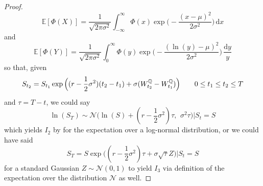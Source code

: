 \documentclass[12pt]{article}
\theoremstyle{definition}
\theoremstyle{remark}
\begin{document}
\begin{proof}
	$$
	\mathbb{E}[\Phi(X)] = \frac{1}{\sqrt{2\pi\sigma^2}} \int_{-\infty}^\infty \Phi(x) \exp \Big( -\frac{(x-\mu)^2}{2\sigma^2} \Big) \,\mathrm{d}x
	$$
	and
	$$
	\mathbb{E}[\Phi(Y)] = \frac{1}{\sqrt{2\pi\sigma^2}} \int_0^\infty \Phi(y) \exp \Big( -\frac{(\ln(y)-\mu)^2}{2\sigma^2} \Big) \,\frac{\mathrm{d}y}{y}
	$$
	so that, given
	$$
	\vphantom{\int} S_{t_2} = S_{t_1} \exp \Big( (r - \frac{1}{2} \sigma^2)(t_2-t_1) + \sigma (W_{t_2}^\mathbb{Q} - W_{t_1}^\mathbb{Q}) \Big) \quad\quad 0\leq t_1 \leq t_2 \leq T
	$$
	and $\tau = T-t$, we could say
	$$
	\ln (S_T) \sim \mathcal{N} \Big( \ln(S) + (r - \frac{1}{2}\sigma^2)\tau,\, \ \sigma^2 \tau \Big) \Big| S_t = S
	$$
	which yields $I_2$ by for the expectation over a log-normal distribution, or we could have said
	$$
	S_T = S \exp \Big( (r - \frac{1}{2}\sigma^2)\tau + \sigma \sqrt{\tau} Z \Big) \Big| S_t = S
	$$
	for a standard Gaussian $Z \sim \mathcal{N}(0,1)$ to yield $I_3$ via definition of the expectation over the distribution $\mathcal{N}$ as well.
\end{proof}
\end{document}
